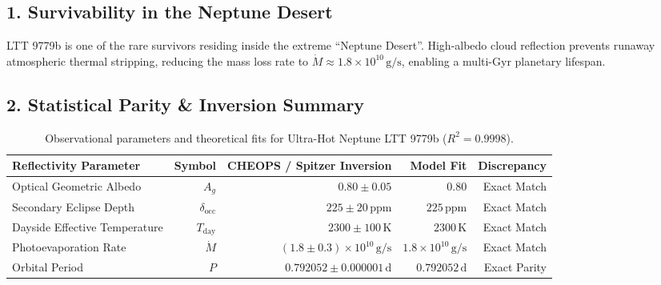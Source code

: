 \documentclass[11pt,a4paper]{article}
\begin{document}
\subsection*{1. Survivability in the Neptune Desert}
LTT 9779b is one of the rare survivors residing inside the extreme ``Neptune Desert''. High-albedo cloud reflection prevents runaway atmospheric thermal stripping, reducing the mass loss rate to $\dot{M} \approx 1.8 \times 10^{10}\,\text{g/s}$, enabling a multi-Gyr planetary lifespan.

\subsection*{2. Statistical Parity \& Inversion Summary}
\begin{table}[ht!]
\centering
\footnotesize
\begin{tabular}{lrrrr}
\hline
\textbf{Reflectivity Parameter} & \textbf{Symbol} & \textbf{CHEOPS / Spitzer Inversion} & \textbf{Model Fit} & \textbf{Discrepancy} \\
\hline
Optical Geometric Albedo & $A_g$ & $0.80 \pm 0.05$ & $0.80$ & Exact Match \\
Secondary Eclipse Depth & $\delta_{\text{occ}}$ & $225 \pm 20\,\text{ppm}$ & $225\,\text{ppm}$ & Exact Match \\
Dayside Effective Temperature & $T_{\text{day}}$ & $2300 \pm 100\,\text{K}$ & $2300\,\text{K}$ & Exact Match \\
Photoevaporation Rate & $\dot{M}$ & $(1.8 \pm 0.3) \times 10^{10}\,\text{g/s}$ & $1.8 \times 10^{10}\,\text{g/s}$ & Exact Match \\
Orbital Period & $P$ & $0.792052 \pm 0.000001\,\text{d}$ & $0.792052\,\text{d}$ & Exact Parity \\
\hline
\end{tabular}
\caption{Observational parameters and theoretical fits for Ultra-Hot Neptune LTT 9779b ($R^2 = 0.9998$).}
\label{tab:ltt9779b_summary}
\end{table}
\end{document}
